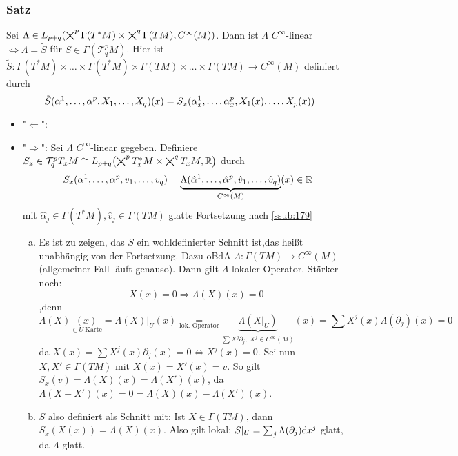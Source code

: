 \subsubsection{Satz}
\label{ssub:178}
Sei $\Lambda \in L_{p+q} (\bigtimes^p \Gamma(T^* M)\times \bigtimes^q \Gamma(TM),C^\infty (M))$. Dann ist $\Lambda$ $C^\infty$-linear $\Leftrightarrow \Lambda = \tilde{S}$ für $S\in \Gamma(\mathcal{T}_q^p M)$. Hier ist $\tilde{S}:\Gamma(T^* M)\times \ldots \times \Gamma(T^* M)\times \Gamma(TM)\times \ldots \times \Gamma(TM)\to C^\infty(M)$ definiert durch
\[
\tilde{S}(\alpha^1,\ldots,\alpha^p,X_1,\ldots,X_q)(x) = S_x(\alpha_x^1,\ldots,\alpha_x^p,X_1(x),\ldots,X_p(x))
\]
\begin{itemize}
\item "$\Leftarrow$":
\item "$\Rightarrow$": Sei $\Lambda$ $C^\infty$-linear gegeben. Definiere $S_x\in \mathcal{T}_q^p T_x M\cong L_{p+q}\enbrace*{\bigtimes^p T^*_x M \times \bigtimes^q T_x M,\mathds{R}}$ durch
\[
S_x(\alpha^1,\ldots,\alpha^p,v_1,\ldots,v_q) = \underbrace{\Lambda(\hat{\alpha}^1,\ldots,\hat{\alpha}^p,\hat{v}_1,\ldots,\hat{v}_q)}_{C^\infty(M)}(x) \in \mathbb{R}
\]
mit $\hat{\alpha}_j \in \Gamma(T^* M), \hat{v}_j \in \Gamma(TM)$ glatte Fortsetzung nach \ref{ssub:179}
\begin{enumerate}[(a)]
\item Es ist zu zeigen, das $S$ ein wohldefinierter Schnitt ist,das heißt unabhängig von der Fortsetzung. Dazu oBdA $\Lambda:\Gamma(TM)\to C^\infty (M)$ (allgemeiner Fall läuft genauso). Dann gilt $\Lambda$ lokaler Operator. Stärker noch:
\[
X(x) = 0\Rightarrow \Lambda(X)(x) = 0
\]
,denn
\[
\Lambda(X)\underset{\in U\ \text{Karte}}{(x)} = \Lambda(X)\vert_U (x) \underset{\text{lok. Operator}}{=} \underbrace{\Lambda(X\vert_U)}_{\sum X^j \partial_j,\ X^j\in C^\infty (M)}(x) = \sum X^j(x) \Lambda(\partial_j)(x) = 0
\]
da $X(x) = \sum X^j(x)\partial_j(x) = 0 \Leftrightarrow X^j(x) = 0$. Sei nun $X,X' \in \Gamma(TM)$ mit $X(x) = X'(x) = v$. So gilt $S_x(v) = \Lambda(X)(x) = \Lambda(X')(x)$, da $\Lambda(X-X')(x) = 0 = \Lambda(X)(x) - \Lambda(X')(x)$.
\item $S$ also definiert als Schnitt mit:  Ist $X\in \Gamma(TM)$, dann $S_x(X(x)) = \Lambda(X)(x)$. Also gilt lokal: $S\vert_U = \sum_j \Lambda(\partial_j)\mathrm{d}\mkern-1.0mu x^j$ glatt, da $\Lambda$ glatt.
\end{enumerate}
\end{itemize}

